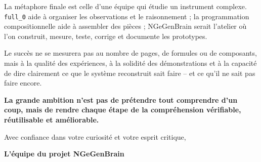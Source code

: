 \documentclass[11pt,a4paper]{article}
\begin{document}
La métaphore finale est celle d'une équipe qui étudie un instrument complexe. \texttt{full\_0} aide à organiser les observations et le raisonnement ; la programmation compositionnelle aide à assembler des pièces ; NGeGenBrain serait l'atelier où l'on construit, mesure, teste, corrige et documente les prototypes.

Le succès ne se mesurera pas au nombre de pages, de formules ou de composants, mais à la qualité des expériences, à la solidité des démonstrations et à la capacité de dire clairement ce que le système reconstruit sait faire -- et ce qu'il ne sait pas faire encore.

\medskip
\noindent\textbf{La grande ambition n'est pas de prétendre tout comprendre d'un coup, mais de rendre chaque étape de la compréhension vérifiable, réutilisable et améliorable.}

\bigskip
\noindent Avec confiance dans votre curiosité et votre esprit critique,

\noindent\textbf{L'équipe du projet NGeGenBrain}
\end{document}
